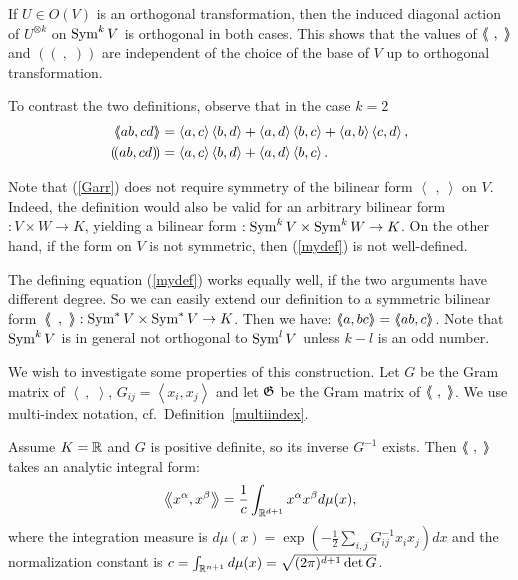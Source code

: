 If $U\in O(V)$ is an orthogonal transformation, then the induced diagonal action of $U^{\otimes k}$ on $\operatorname{Sym}^kV$ is orthogonal in both cases. This shows that the values of $\bra\ ,\;\ket$ and $\left(\!\left(\ ,\;\right)\!\right)$ are independent of the choice of the base of $V$ up to orthogonal transformation. 
\begin{example}
To contrast the two definitions, observe that in the case $k=2$
\begin{align}
\bra ab,cd\ket &= \left<a,c\right>\left<b,d\right>+\left<a,d\right>\left<b,c\right> + \left<a,b\right>\left<c,d\right>, \\
\left(\!\left( ab,cd \right)\!\right) &= \left<a,c\right>\left<b,d\right>+\left<a,d\right>\left<b,c\right>.
\end{align}
\end{example}
\begin{remark}
Note that (\ref{Garr}) does not require symmetry of the bilinear form $\left<\,\ ,\ \right>$ on $V$. Indeed, the definition would also be valid for an arbitrary bilinear form~$: V\times W \rightarrow K$, yielding a bilinear form $:\operatorname{Sym}^kV\times\operatorname{Sym}^kW\rightarrow K$. On the other hand, if the form on $V$ is not symmetric, then (\ref{mydef}) is not well-defined.
\end{remark}
\begin{remark}
The defining equation (\ref{mydef}) works equally well, if the two arguments have different degree. So we can easily extend our definition to a symmetric bilinear form~$\bra\ \,,\ \ket:\Sym^*V\times\Sym^*V \rightarrow K$. Then we have: $\bra a,bc\ket =\bra ab,c\ket$. Note that $\operatorname{Sym}^kV$ is in general not orthogonal to $\operatorname{Sym}^lV$ unless $k-l$ is an odd number.
\end{remark}
We wish to investigate some properties of this construction. Let $G$ be the Gram matrix of $\left< \ ,\;\right>$, \ie $G_{ij} = \left<x_i,x_j\right>$ and
let $\mathfrak{G}$ be the Gram matrix of $\bra\ ,\;\ket$. We use multi-index notation, cf.~Definition~\ref{multiindex}.
\begin{proposition} \label{intequiv}Assume $K=\mathbb{R}$ and $G$ is positive definite, so its inverse $G^{-1} $ exists. Then $\bra\ ,\;\ket$ takes an analytic integral form:
\begin{equation*}
\left<\!\!\!\:\left< x^\alpha, x^\beta \right>\!\!\!\:\right> = \frac{1}{c}\int_{\mathbb{R}^{d+1}} x^\alpha x^\beta d\mu(x),
\end{equation*}
where the integration measure is $d\mu(x) = \exp\left(-\frac{1}{2}\sum_{i,j} G^{-1}_{ij}x_ix_j\right)dx$ and the normalization constant is $c=\int_{\mathbb{R}^{n+1}} d\mu(x)=\sqrt{(2\pi)^{d+1}\det G}$.
\end{proposition}
